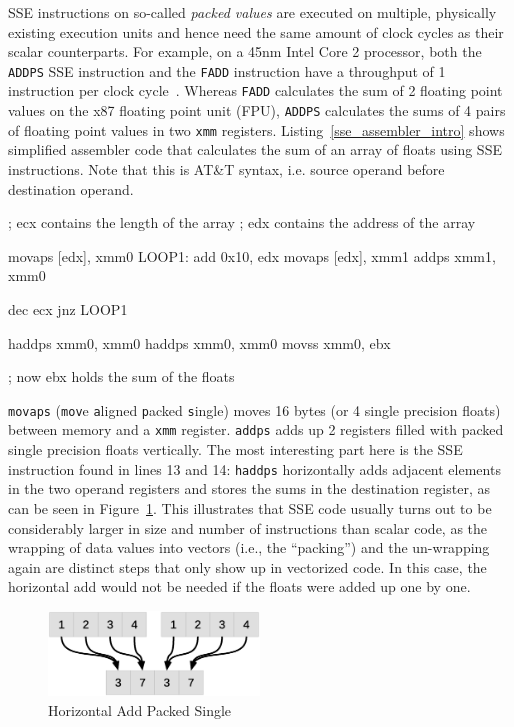 SSE instructions on so-called \emph{packed values} are executed on multiple, physically existing execution units and hence need the same amount of clock cycles as their scalar counterparts. For example, on a 45nm Intel Core 2 processor, both the \texttt{ADDPS} SSE instruction and the \texttt{FADD} instruction have a throughput of 1 instruction per clock cycle~\cite[pp. 50, 57]{fog2011instructiontables}. Whereas \texttt{FADD} calculates the sum of 2 floating point values on the x87 floating point unit (FPU), \texttt{ADDPS} calculates the sums of 4 pairs of floating point values in two \texttt{xmm} registers. Listing~\ref{sse_assembler_intro} shows simplified assembler code that calculates the sum of an array of floats using SSE instructions. Note that this is AT\&T syntax, i.e. source operand before destination operand.
\begin{assembler}[caption={Array sum using simplified SSE assembly}, label=sse_assembler_intro]
  ; ecx contains the length of the array
  ; edx contains the address of the array

  movaps [edx], xmm0
LOOP1:
  add    0x10, edx
  movaps [edx], xmm1
  addps  xmm1, xmm0

  dec    ecx
  jnz    LOOP1

  haddps xmm0, xmm0
  haddps xmm0, xmm0
  movss  xmm0, ebx

  ; now ebx holds the sum of the floats
\end{assembler}

\texttt{movaps} (\texttt{mov}e \texttt{a}ligned \texttt{p}acked \texttt{s}ingle) moves 16 bytes (or 4 single precision floats) between memory and a \texttt{xmm} register. \texttt{addps} adds up 2 registers filled with packed single precision floats vertically. The most interesting part here is the SSE instruction found in lines 13 and 14: \texttt{haddps} horizontally adds adjacent elements in the two operand registers and stores the sums in the destination register, as can be seen in Figure~\ref{fig:haddps}. This illustrates that SSE code usually turns out to be considerably larger in size and number of instructions than scalar code, as the wrapping of data values into vectors (i.e., the ``packing'') and the un-wrapping again are distinct steps that only show up in vectorized code. In this case, the horizontal add would not be needed if the floats were added up one by one.

\begin{figure}[h]
\begin{center}
\includegraphics[width=0.5\textwidth]{img/haddps}
\end{center}
\caption{Horizontal Add Packed Single}
\label{fig:haddps}
\end{figure}

